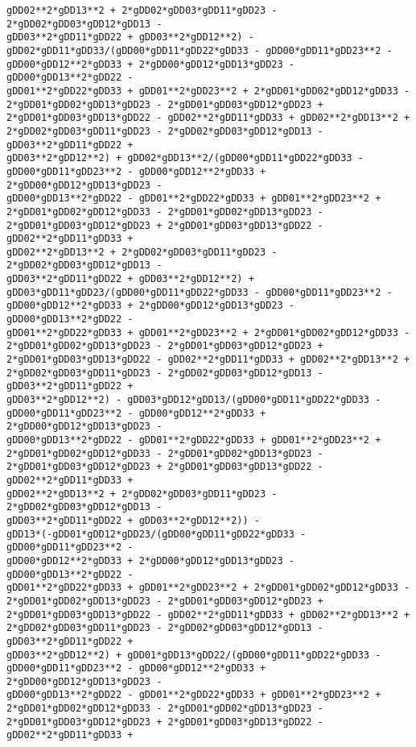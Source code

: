 \documentclass[landscape,letterpaper,10pt,english]{article}
\begin{document}
\begin{Verbatim}[commandchars=\\\{\}]
gDD02**2*gDD13**2 + 2*gDD02*gDD03*gDD11*gDD23 - 2*gDD02*gDD03*gDD12*gDD13 -
gDD03**2*gDD11*gDD22 + gDD03**2*gDD12**2) -
gDD02*gDD11*gDD33/(gDD00*gDD11*gDD22*gDD33 - gDD00*gDD11*gDD23**2 -
gDD00*gDD12**2*gDD33 + 2*gDD00*gDD12*gDD13*gDD23 - gDD00*gDD13**2*gDD22 -
gDD01**2*gDD22*gDD33 + gDD01**2*gDD23**2 + 2*gDD01*gDD02*gDD12*gDD33 -
2*gDD01*gDD02*gDD13*gDD23 - 2*gDD01*gDD03*gDD12*gDD23 +
2*gDD01*gDD03*gDD13*gDD22 - gDD02**2*gDD11*gDD33 + gDD02**2*gDD13**2 +
2*gDD02*gDD03*gDD11*gDD23 - 2*gDD02*gDD03*gDD12*gDD13 - gDD03**2*gDD11*gDD22 +
gDD03**2*gDD12**2) + gDD02*gDD13**2/(gDD00*gDD11*gDD22*gDD33 -
gDD00*gDD11*gDD23**2 - gDD00*gDD12**2*gDD33 + 2*gDD00*gDD12*gDD13*gDD23 -
gDD00*gDD13**2*gDD22 - gDD01**2*gDD22*gDD33 + gDD01**2*gDD23**2 +
2*gDD01*gDD02*gDD12*gDD33 - 2*gDD01*gDD02*gDD13*gDD23 -
2*gDD01*gDD03*gDD12*gDD23 + 2*gDD01*gDD03*gDD13*gDD22 - gDD02**2*gDD11*gDD33 +
gDD02**2*gDD13**2 + 2*gDD02*gDD03*gDD11*gDD23 - 2*gDD02*gDD03*gDD12*gDD13 -
gDD03**2*gDD11*gDD22 + gDD03**2*gDD12**2) +
gDD03*gDD11*gDD23/(gDD00*gDD11*gDD22*gDD33 - gDD00*gDD11*gDD23**2 -
gDD00*gDD12**2*gDD33 + 2*gDD00*gDD12*gDD13*gDD23 - gDD00*gDD13**2*gDD22 -
gDD01**2*gDD22*gDD33 + gDD01**2*gDD23**2 + 2*gDD01*gDD02*gDD12*gDD33 -
2*gDD01*gDD02*gDD13*gDD23 - 2*gDD01*gDD03*gDD12*gDD23 +
2*gDD01*gDD03*gDD13*gDD22 - gDD02**2*gDD11*gDD33 + gDD02**2*gDD13**2 +
2*gDD02*gDD03*gDD11*gDD23 - 2*gDD02*gDD03*gDD12*gDD13 - gDD03**2*gDD11*gDD22 +
gDD03**2*gDD12**2) - gDD03*gDD12*gDD13/(gDD00*gDD11*gDD22*gDD33 -
gDD00*gDD11*gDD23**2 - gDD00*gDD12**2*gDD33 + 2*gDD00*gDD12*gDD13*gDD23 -
gDD00*gDD13**2*gDD22 - gDD01**2*gDD22*gDD33 + gDD01**2*gDD23**2 +
2*gDD01*gDD02*gDD12*gDD33 - 2*gDD01*gDD02*gDD13*gDD23 -
2*gDD01*gDD03*gDD12*gDD23 + 2*gDD01*gDD03*gDD13*gDD22 - gDD02**2*gDD11*gDD33 +
gDD02**2*gDD13**2 + 2*gDD02*gDD03*gDD11*gDD23 - 2*gDD02*gDD03*gDD12*gDD13 -
gDD03**2*gDD11*gDD22 + gDD03**2*gDD12**2)) -
gDD13*(-gDD01*gDD12*gDD23/(gDD00*gDD11*gDD22*gDD33 - gDD00*gDD11*gDD23**2 -
gDD00*gDD12**2*gDD33 + 2*gDD00*gDD12*gDD13*gDD23 - gDD00*gDD13**2*gDD22 -
gDD01**2*gDD22*gDD33 + gDD01**2*gDD23**2 + 2*gDD01*gDD02*gDD12*gDD33 -
2*gDD01*gDD02*gDD13*gDD23 - 2*gDD01*gDD03*gDD12*gDD23 +
2*gDD01*gDD03*gDD13*gDD22 - gDD02**2*gDD11*gDD33 + gDD02**2*gDD13**2 +
2*gDD02*gDD03*gDD11*gDD23 - 2*gDD02*gDD03*gDD12*gDD13 - gDD03**2*gDD11*gDD22 +
gDD03**2*gDD12**2) + gDD01*gDD13*gDD22/(gDD00*gDD11*gDD22*gDD33 -
gDD00*gDD11*gDD23**2 - gDD00*gDD12**2*gDD33 + 2*gDD00*gDD12*gDD13*gDD23 -
gDD00*gDD13**2*gDD22 - gDD01**2*gDD22*gDD33 + gDD01**2*gDD23**2 +
2*gDD01*gDD02*gDD12*gDD33 - 2*gDD01*gDD02*gDD13*gDD23 -
2*gDD01*gDD03*gDD12*gDD23 + 2*gDD01*gDD03*gDD13*gDD22 - gDD02**2*gDD11*gDD33 +

\end{Verbatim}
\end{document}
